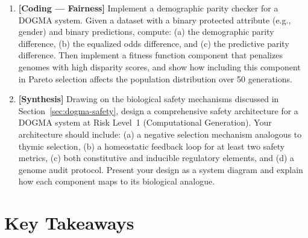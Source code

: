 \begin{enumerate}[label=\textbf{17.\arabic*.}, leftmargin=2.5em]
\item \textbf{[Coding --- Fairness]} Implement a demographic parity checker for a DOGMA system. Given a dataset with a binary protected attribute (e.g., gender) and binary predictions, compute: (a) the demographic parity difference, (b) the equalized odds difference, and (c) the predictive parity difference. Then implement a fitness function component that penalizes genomes with high disparity scores, and show how including this component in Pareto selection affects the population distribution over 50 generations.

\item \textbf{[Synthesis]} Drawing on the biological safety mechanisms discussed in Section~\ref{sec:dogma-safety}, design a comprehensive safety architecture for a DOGMA system at Risk Level~1 (Computational Generation). Your architecture should include: (a) a negative selection mechanism analogous to thymic selection, (b) a homeostatic feedback loop for at least two safety metrics, (c) both constitutive and inducible regulatory elements, and (d) a genome audit protocol. Present your design as a system diagram and explain how each component maps to its biological analogue.

\end{enumerate}

\section{Key Takeaways}

